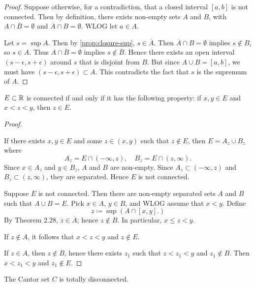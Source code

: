 \begin{proof}
Suppose otherwise, for a contradiction, that a closed interval $[a,b]$ is not connected. Then by definition, there exists non-empty sets $A$ and $B$, with $A\cap\overline{B}=\emptyset$ and $\overline{A}\cap B=\emptyset$. WLOG let $a\in A$.

Let $s=\sup A$. Then by \cref{prop:closure-sup}, $s\in\overline{A}$. Then $\overline{A}\cap B=\emptyset$ implies $s\notin B$, so $s\in A$. Thus $A\cap\overline{B}=\emptyset$ implies $s\notin\overline{B}$. Hence there exists an open interval $(s-\epsilon,s+\epsilon)$ around $s$ that is disjoint from $B$. But since $A\cup B=[a,b]$, we must have $(s-\epsilon,s+\epsilon)\subset A$. This contradicts the fact that $s$ is the supremum of $A$. 
\end{proof}

\begin{proposition}\label{prop:connected-interval-R}
$E\subset\mathbb R$ is connected if and only if it has the following property: if $x,y\in E$ and $x<z<y$, then $z\in E$.
\end{proposition}

\begin{proof} \

\fbox{$\impliedby$} If there exists $x,y\in E$ and some $z\in(x,y)$ such that $z\notin E$, then $E=A_z\cup B_z$ where
\[ A_z=E\cap(-\infty,z), \quad B_z=E\cap(z,\infty). \]
Since $x\in A_z$ and $y\in B_z$, $A$ and $B$ are non-empty. Since $A_z\subset(-\infty,z)$ and $B_z\subset(z,\infty)$, they are separated. Hence $E$ is not connected.

\fbox{$\implies$} Suppose $E$ is not connected. Then there are non-empty separated sets $A$ and $B$ such that $A\cup B=E$. Pick $x\in A$, $y\in B$, and WLOG assume that $x<y$. Define
\[z\coloneqq\sup(A\cap[x,y].)\]
By Theorem 2.28, $z\in\overline{A}$; hence $z\notin B$. In particular, $x\le z<y$.

If $z\notin A$, it follows that $x<z<y$ and $z\notin E$.

If $z\in A$, then $z\notin B$, hence there exists $z_1$ such that $z<z_1<y$ and $z_1\notin B$. Then $x<z_1<y$ and $z_1\notin E$.
\end{proof}

\begin{proposition}
The Cantor set $C$ is totally disconnected.
\end{proposition}
\pagebreak

